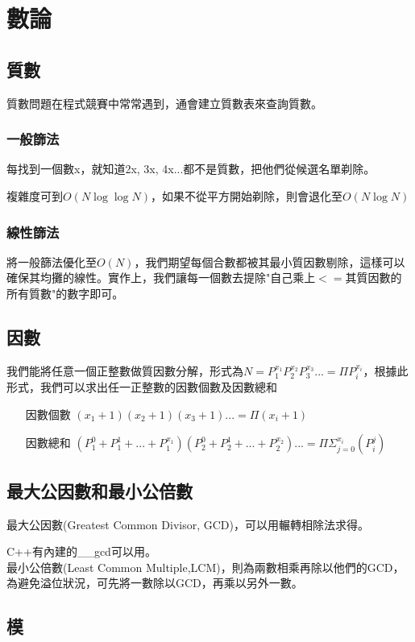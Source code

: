 \section{數論}
\subsection{質數}
質數問題在程式競賽中常常遇到，通會建立質數表來查詢質數。
\subsubsection{一般篩法}
每找到一個數x，就知道2x, 3x, 4x...都不是質數，把他們從候選名單剃除。

複雜度可到$O(N\log\log N)$，如果不從平方開始剃除，則會退化至$O(N\log N)$
\subsubsection{線性篩法}
將一般篩法優化至$O(N)$，我們期望每個合數都被其最小質因數剔除，這樣可以確保其均攤的線性。實作上，我們讓每一個數去提除"自己乘上$<=$其質因數的所有質數"的數字即可。

\subsection{因數}
我們能將任意一個正整數做質因數分解，形式為$N=P_{1}^{x_{1}}P_{2}^{x_{2}}P_{3}^{x_{3}}...=\Pi P_{i}^{x_{i}}$，根據此形式，我們可以求出任一正整數的因數個數及因數總和
\begin{enumerate}
\item [因數個數] $(x_{1}+1)(x_{2}+1)(x_{3}+1)...=\Pi (x_{i}+1)$
\item [因數總和] $(P_{1}^{0}+P_{1}^{1}+...+P_{1}^{x_{1}})(P_{2}^{0}+P_{2}^{1}+...+P_{2}^{x_{2}})...=\Pi\Sigma_{j=0}^{x_{i}}(P_{i}^{j})$
\end{enumerate}
\subsection{最大公因數和最小公倍數}
最大公因數(Greatest Common Divisor, GCD)，可以用輾轉相除法求得。

C++有內建的\_\_gcd可以用。\\
最小公倍數(Least Common Multiple,LCM)，則為兩數相乘再除以他們的GCD，為避免溢位狀況，可先將一數除以GCD，再乘以另外一數。
\subsection{模}
